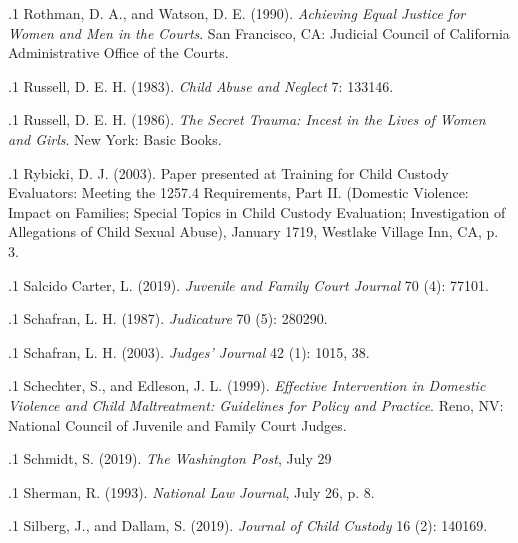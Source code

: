 \documentclass[11pt, twoside]{article}
\begin{document}
{{\p.1{%
Rothman, D. A., and Watson, D. E. (1990). \textit{Achieving Equal Justice for Women and Men
in the Courts}. San Francisco, CA: Judicial Council of California Administrative
Office of the Courts.
}%

\p.1{%
Russell, D. E. H. (1983).  \textit{Child Abuse and Neglect} 7: 133\ndash{}146.
}%

\p.1{%
Russell, D. E. H. (1986). \textit{The Secret Trauma: Incest in the Lives of
Women and Girls}. New York: Basic Books.
}%

\p.1{%
Rybicki, D. J. (2003).  Paper presented at Training for Child Custody Evaluators: Meeting the
1257.4 Requirements, Part II. (Domestic Violence: Impact on Families; Special
Topics in Child Custody Evaluation; Investigation of Allegations of Child Sexual
Abuse), January 17\ndash{}19, Westlake Village Inn, CA, p. 3.
}%

\p.1{%
Salcido Carter, L. (2019).  \textit{Juvenile and
Family Court Journal} 70 (4): 77\ndash{}101.
}%

\p.1{%
Schafran, L. H. (1987).  \textit{Judicature} 70 (5): 280\ndash{}290.
}%

\p.1{%
Schafran, L. H. (2003). 
\textit{Judges’ Journal} 42 (1): 10\ndash{}15, 38.
}%

\p.1{%
Schechter, S., and Edleson, J. L. (1999). \textit{Effective Intervention in Domestic Violence
and Child Maltreatment: Guidelines for Policy and Practice}. Reno, NV: National
Council of Juvenile and Family Court Judges.
}%

\p.1{%
Schmidt, S. (2019).  \textit{The Washington Post}, July
29
}%

\p.1{%
Sherman, R. (1993).  \textit{National
Law Journal}, July 26, p. 8.
}%

\p.1{%
Silberg, J., and Dallam, S. (2019).  \textit{Journal of Child Custody} 16 (2): 140\ndash{}169.
}%

}}
\end{document}
